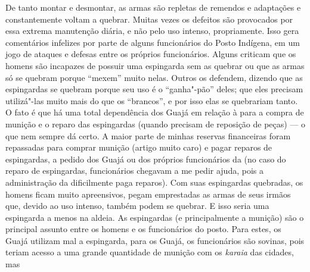 De tanto montar e desmontar, as armas são repletas de remendos e
adaptações e constantemente voltam a quebrar. Muitas vezes os defeitos
são provocados por essa extrema manutenção diária, e não pelo uso
intenso, propriamente. Isso gera comentários infelizes por parte de
alguns funcionários do Posto Indígena, em um jogo de ataques e defesas
entre os próprios funcionários. Alguns criticam que os homens são
incapazes de possuir uma espingarda sem as quebrar ou que as armas só se
quebram porque ``mexem'' muito nelas. Outros os defendem, dizendo que as
espingardas se quebram porque seu uso é o ``ganha"-pão'' deles; que eles
precisam utilizá"-las muito mais do que os ``brancos'', e por isso elas se
quebrariam tanto. O fato é que há uma total dependência dos Guajá em
relação à  para a compra de munição e o reparo das espingardas
(quando precisam de reposição de peças) --- o que nem sempre dá certo. A
maior parte de minhas reservas financeiras foram repassadas para comprar
munição (artigo muito caro) e pagar reparos de espingardas, a pedido dos
Guajá ou dos próprios funcionários da  (no caso do reparo de
espingardas, funcionários chegavam a me pedir ajuda, pois a
administração da  dificilmente paga reparos). Com suas espingardas
quebradas, os homens ficam muito apreensivos, pegam emprestadas as armas
de seus irmãos que, devido ao uso intenso, também podem se quebrar. E
isso seria uma espingarda a menos na aldeia. As espingardas (e
principalmente a munição) são o principal assunto entre os homens e os
funcionários do posto. Para estes, os Guajá utilizam mal a espingarda,
para os Guajá, os funcionários são sovinas, pois teriam acesso a uma
grande quantidade de munição com os \emph{karaia} das cidades, mas
